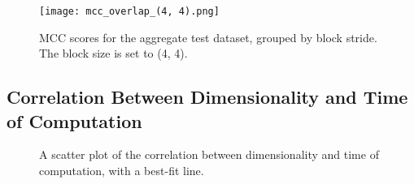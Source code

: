 \begin{figure}
    \centering
    \texttt{[image: mcc\_overlap\_(4, 4).png]}
    \caption{
        MCC scores for the aggregate test dataset, grouped by block stride. The block size is set to (4, 4).
    }
    \label{fig:overlap_4_4}
\end{figure}

\subsection{Correlation Between Dimensionality and Time of Computation}

\begin{figure}
    
    \caption{
        A scatter plot of the correlation between dimensionality and time of computation, with a best-fit line.
    }
    \label{fig:correlation_with_best_fit}
\end{figure}